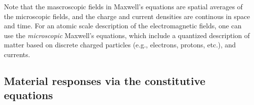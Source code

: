 Note that the mascroscopic fields in Maxwell's equations
are spatial averages of the
microscopic fields, and the charge and current densities are continous in space
and time.
For an atomic scale description of the electromagnetic fields, one can use the
\emph{microscopic}
Maxwell's equations, which include a quantized description of matter based on
discrete charged particles
(e.g., electrons, protons, etc.), and currents.\\

\subsection*{Material responses via the constitutive equations}

